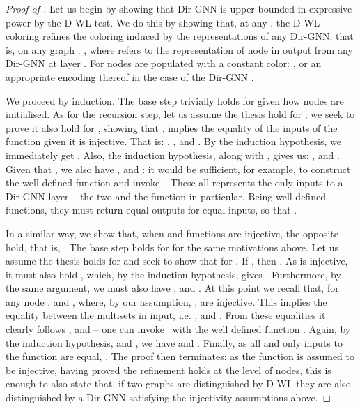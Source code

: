 \documentclass{article}
\newcommand\oursacro{Dir-GNN}
\theoremstyle{plain}
\theoremstyle{definition}
\theoremstyle{remark}
\begin{document}
\begin{proof}[Proof of ]

Let us begin by showing that \oursacro{} is upper-bounded in expressive power by the D-WL test. We do this by showing that, at any , the D-WL coloring  refines the coloring induced by the representations of any \oursacro{}, that is, on any graph , , where  refers to the representation of node  in output from any \oursacro{} at layer . For  nodes are populated with a constant color: , or an appropriate encoding thereof in the case of the Dir-GNN .

We proceed by induction. The base step trivially holds for  given how nodes are initialised. As for the recursion step, let us assume the thesis hold for ; we seek to prove it also hold for , showing that .  implies the equality of the inputs of the  function given it is injective. That is: , , and . By the induction hypothesis, we immediately get . Also, the induction hypothesis, along with \citep[Lemma 2]{bevilacqua2022equivariant}, gives us: , and . Given that , we also have , and : it would be sufficient, for example, to construct the well-defined function  and invoke~\citep[Lemma 3]{bevilacqua2022equivariant}. These all represents the only inputs to a \oursacro{} layer -- the two  and the  function in particular. Being well defined functions, they must return equal outputs for equal inputs, so that  .

In a similar way, we show that, when  and  functions are injective, the opposite hold, that is, . The base step holds for  for the same motivations above. Let us assume the thesis holds for  and seek to show that for . If , then . As  is injective, it must also hold , which, by the induction hypothesis, gives . Furthermore, by the same argument, we must also have , and . At this point we recall that, for any node ,  and , where, by our assumption, ,  are injective. This implies the equality between the multisets in input, i.e. , and . From these equalities it clearly follows , and  -- one can invoke~\citep[Lemma 3]{bevilacqua2022equivariant} with the well defined function . Again, by the induction hypothesis, and \citep[Lemma 2]{bevilacqua2022equivariant}, we have  and . Finally, as all and only inputs to the  function are equal, . The proof then terminates: as the  function is assumed to be injective, having proved the refinement holds at the level of nodes, this is enough to also state that, if two graphs are distinguished by D-WL they are also distinguished by a \oursacro{} satisfying the injectivity assumptions above.
\end{proof}
\end{document}
